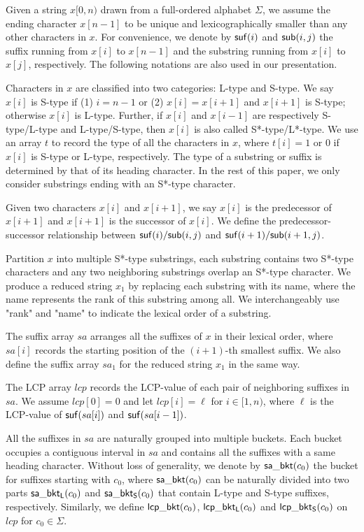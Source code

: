 \documentclass[10pt,journal,compsoc]{IEEEtran}
\begin{document}
Given a string $x[0,n)$ drawn from a full-ordered alphabet $\Sigma$, we assume the ending character $x[n - 1]$ to be unique and lexicographically smaller than any other characters in $x$. For convenience, we denote by ${\sf suf}(i)$ and ${\sf sub}(i, j)$ the suffix running from $x[i]$ to $x[n-  1]$ and the substring running from $x[i]$ to $x[j]$, respectively. The following notations are also used in our presentation.

Characters in $x$ are classified into two categories: L-type and S-type. We say $x[i]$ is S-type if (1) $i = n - 1$ or (2) $x[i] = x[i + 1]$ and $x[i + 1]$ is S-type; otherwise $x[i]$ is L-type. Further, if $x[i]$ and $x[i - 1]$ are respectively S-type/L-type and L-type/S-type, then $x[i]$ is also called S*-type/L*-type. We use an array $t$ to record the type of all the characters in $x$, where $t[i] = 1$ or $0$ if $x[i]$ is S-type or L-type, respectively. The type of a substring or suffix is determined by that of its heading character. In the rest of this paper, we only consider substrings ending with an S*-type character.

Given two characters $x[i]$ and $x[i + 1]$, we say $x[i]$ is the predecessor of $x[i + 1]$ and $x[i + 1]$ is the successor of $x[i]$. We define the predecessor-successor relationship between ${\sf suf}(i)/{\sf sub}(i, j)$ and ${\sf suf}(i + 1)/{\sf sub}(i + 1, j)$.

Partition $x$ into multiple S*-type substrings, each substring contains two S*-type characters and any two neighboring substrings overlap an S*-type character. We produce a reduced string $x_1$ by replacing each substring with its name, where the name represents the rank of this	 substring among all. We interchangeably use "rank" and "name"  to indicate the lexical order of a substring.

The suffix array $sa$ arranges all the suffixes of $x$ in their lexical order, where $sa[i]$ records the starting position of the $(i + 1)$-th smallest suffix. We also define the suffix array $sa_1$ for the reduced string $x_1$ in the same way.

The LCP array $lcp$ records the LCP-value of each pair of neighboring suffixes in $sa$. We assume $lcp[0] = 0$ and let $lcp[i] = \ell$ for $i \in [1, n)$, where $\ell$ is the LCP-value of ${\sf suf}(sa[i])$ and ${\sf suf}(sa[i - 1])$.

All the suffixes in $sa$ are naturally grouped into multiple buckets. Each bucket occupies a contiguous interval in $sa$ and contains all the suffixes with a same heading character. Without loss of generality, we denote by ${\sf sa\_bkt}(c_0)$ the bucket for suffixes starting with $c_0$, where ${\sf sa\_bkt}(c_0)$ can be naturally divided into two parts ${\sf sa\_bkt_L}(c_0)$ and ${\sf sa\_bkt_S}(c_0)$ that contain L-type and S-type suffixes, respectively. Similarly, we define ${\sf lcp\_bkt}(c_0)$, ${\sf lcp\_bkt_L}(c_0)$ and ${\sf lcp\_bkt_S}(c_0)$ on $lcp$ for $c_0 \in \Sigma$.
\end{document}
